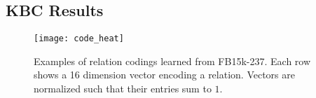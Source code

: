 \documentclass[11pt,a4paper]{article}
\newcommand{\setoftriples}{\mathcal{T}}
\newcommand{\setofents}{\mathcal{E}}
\newcommand{\mtriple}[3]{\langle #1, #2, #3 \rangle}
\begin{document}

\subsection{KBC Results}\label{sec:mainresults}


\begin{figure}[!t]
\centering
\texttt{[image: code\_heat]}
\caption{%
Examples of relation codings learned from FB15k-237. Each row shows 
a 16 dimension vector encoding a relation. Vectors are normalized 
such that their entries sum to $1$.}
\label{fig:code-heatmap}
\end{figure}
\end{document}
